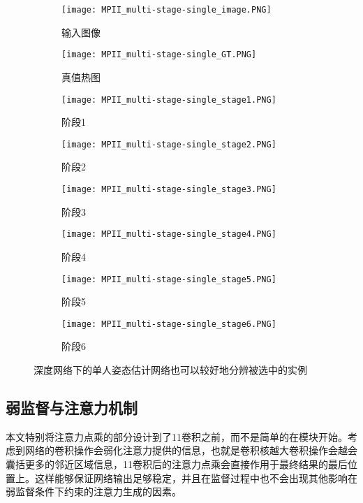 \begin{figure}[h]
\centering
\begin{subfigure}{0.2\linewidth}
	\texttt{[image: MPII\_multi-stage-single\_image.PNG]}
	\caption{输入图像}
\end{subfigure}
\begin{subfigure}{0.2\linewidth}
	\texttt{[image: MPII\_multi-stage-single\_GT.PNG]}
	\caption{真值热图}
\end{subfigure}
\begin{subfigure}{0.2\linewidth}
	\texttt{[image: MPII\_multi-stage-single\_stage1.PNG]}
	\caption{阶段1}
\end{subfigure}
\begin{subfigure}{0.2\linewidth}
	\texttt{[image: MPII\_multi-stage-single\_stage2.PNG]}
	\caption{阶段2}
\end{subfigure}

\begin{subfigure}{0.2\linewidth}
	\texttt{[image: MPII\_multi-stage-single\_stage3.PNG]}
	\caption{阶段3}
\end{subfigure}
\begin{subfigure}{0.2\linewidth}
	\texttt{[image: MPII\_multi-stage-single\_stage4.PNG]}
	\caption{阶段4}
\end{subfigure}
\begin{subfigure}{0.2\linewidth}
	\texttt{[image: MPII\_multi-stage-single\_stage5.PNG]}
	\caption{阶段5}
\end{subfigure}
\begin{subfigure}{0.2\linewidth}
	\texttt{[image: MPII\_multi-stage-single\_stage6.PNG]}
	\caption{阶段6}
\end{subfigure}
\caption{深度网络下的单人姿态估计网络也可以较好地分辨被选中的实例}
\label{fig:singleposemultistage}
\end{figure}

\subsection{弱监督与注意力机制}
\label{subsec:weaksuper_attention}

本文特别将注意力点乘的部分设计到了1\times1卷积之前，而不是简单的在模块开始。考虑到网络的卷积操作会弱化注意力提供的信息，也就是卷积核越大卷积操作会越会囊括更多的邻近区域信息，1\times1卷积后的注意力点乘会直接作用于最终结果的最后位置上。这样能够保证网络输出足够稳定，并且在监督过程中也不会出现其他影响在弱监督条件下约束的注意力生成的因素。


